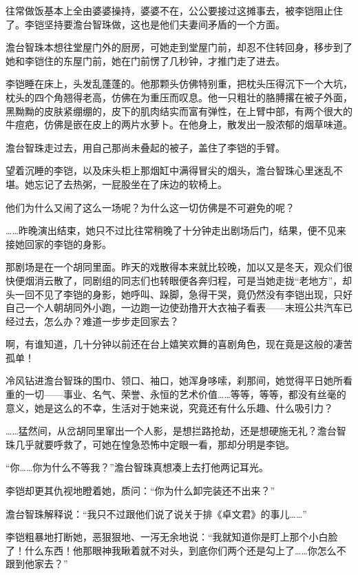 \par 往常做饭基本上全由婆婆操持，婆婆不在，公公要接过这摊事去，被李铠阻止住了。李铠坚持要澹台智珠做，这也是他们夫妻间矛盾的一个方面。
\par 澹台智珠本想往堂屋门外的厨房，可她走到堂屋门前，却忍不住转回身，移步到了她和李铠住的东屋门前，她在门前愣了几秒钟，才推门走了进去。
\par 李铠睡在床上，头发乱蓬蓬的。他那颗头仿佛特别重，把枕头压得沉下一个大坑，枕头的四个角翘得老高，仿佛在为重压而叹息。他一只粗壮的胳膊撂在被子外面，黑黝黝的皮肤紧绷绷的，皮下的肌肉结实而富有弹性，在上臂中部，有两个很大的牛痘疤，仿佛是嵌在皮上的两片水萝卜。在他身上，散发出一股浓郁的烟草味道。
\par 澹台智珠走过去，用自己那尚未叠起的被子，盖住了李铠的手臂。
\par 望着沉睡的李铠，以及床头柜上那烟缸中满得冒尖的烟头，澹台智珠心里迷乱不堪。她忘记了去热粥，一屁股坐在了床边的软椅上。
\par 他们为什么又闹了这么一场呢？为什么这一切仿佛是不可避免的呢？
\par ……昨晚演出结束，她只不过比往常稍晚了十分钟走出剧场后门，结果，便不见来接她回家的李铠的身影。
\par 那剧场是在一个胡同里面。昨天的戏散得本来就比较晚，加以又是冬天，观众们很快便烟消云散了，同剧组的同志们也转眼便各奔归程，可是当她走拢“老地方”，却头一回不见了李铠的身影，她呼叫、跺脚，急得干哭，竟仍然没有李铠出现，只好自己一个人朝胡同外小跑，一边跑一边使劲撸开大衣袖子看表——末班公共汽车已经过去，怎么办？难道一步步走回家去？
\par 啊，有谁知道，几十分钟以前还在台上嬉笑欢舞的喜剧角色，现在竟是这般的凄苦孤单！
\par 冷风钻进澹台智珠的围巾、领口、袖口，她浑身哆嗦，刹那间，她觉得平日她所看重的一切——事业、名气、荣誉、永恒的艺术价值……等等，等等，都没有丝毫的意义，她是这么的不幸，生活对于她来说，究竟还有什么乐趣、什么吸引力？
\par ……猛然间，从岔胡同里窜出一个人影，是想拦路抢劫，还是想硬施无礼？澹台智珠几乎就要呼救了，可她在惶急恐怖中定眼一看，那却分明是李铠。
\par “你……你为什么不等我？”澹台智珠真想凑上去打他两记耳光。
\par 李铠却更其仇视地瞪着她，质问：“你为什么卸完装还不出来？”
\par 澹台智珠解释说：“我只不过跟他们说了说关于排《卓文君》的事儿……”
\par 李铠粗暴地打断她，恶狠狠地、一泻无余地说：“我就知道你是盯上那个小白脸了！什么东西！他那眼神我瞅着就不对头，到底你们两个还是勾上了……你怎么不跟到他家去？”
